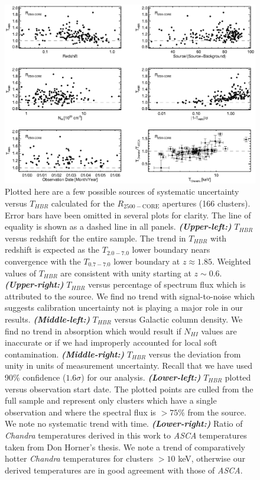 \clearpage
\begin{figure}
\begin{center}
\includegraphics*[width=\textwidth, trim=0mm 0mm 0mm 0mm, clip]{f4.eps}
\caption{
Plotted here are a few possible sources of systematic uncertainty
versus $T_{HBR}$ calculated for the $R_{2500-\mathrm{CORE}}$
apertures (166 clusters). Error bars have been omitted in several
plots for clarity. The line of equality is shown as a dashed line in
all panels.
{\bfseries\em{(Upper-left:)}} $T_{HBR}$ versus redshift for the
entire sample. The trend in $T_{HBR}$ with redshift is expected as the
$T_{2.0-7.0}$ lower boundary nears convergence with the $T_{0.7-7.0}$
lower boundary at $z \approx 1.85$. Weighted values of $T_{HBR}$ are
consistent with unity starting at $z \sim
0.6$.
{\bfseries\em{(Upper-right:)}} $T_{HBR}$ versus percentage of
spectrum flux which is attributed to the source. We find no trend with
signal-to-noise which suggests calibration uncertainty not is playing
a major role in our results.
{\bfseries\em{(Middle-left:)}} $T_{HBR}$
versus Galactic column density. We find no trend in absorption which
would result if $N_{HI}$ values are inaccurate or if we had improperly
accounted for local soft
contamination.
{\bfseries\em{(Middle-right:)}} $T_{HBR}$ versus the
deviation from unity in units of measurement uncertainty. Recall that
we have used 90\% confidence ($1.6\sigma$) for our analysis.
{\bfseries\em{(Lower-left:)}} $T_{HBR}$ plotted versus
observation start date. The plotted points are culled from the full
sample and represent only clusters which have a single observation and
where the spectral flux is $> 75\%$ from the source. We note no
systematic trend with time.
{\bfseries\em{(Lower-right:)}} Ratio of {\it Chandra}
temperatures derived in this work to {\it ASCA} temperatures taken
from Don Horner's thesis. We note a trend of comparatively hotter {\it
Chandra} temperatures for clusters $> 10$ keV, otherwise our derived
temperatures are in good agreement with those of {\it ASCA}.
}
\label{fig:sysr25}
\end{center}
\end{figure}
\clearpage

